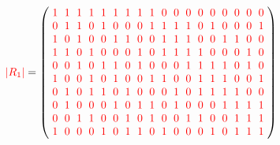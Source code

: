 \documentclass{beamer}
\newcommand{\RR}[1]{\textcolor{red}{#1}}
\newcommand{\abs}[1]{|#1|}
\begin{document}
\begin{frame}

  \[
    \RR{\abs{R_1}} = 
    \left(
      \arraycolsep=3.0pt\def\arraystretch{1.0}
      \begin{array}{cccccccccccccccccc}
        \RR{1}&\RR{1}&\RR{1}&\RR{1}&\RR{1}&\RR{1}&\RR{1}&\RR{1}&\RR{1}&\RR{0}&\RR{0}&\RR{0}&\RR{0}&\RR{0}&\RR{0}&\RR{0}&\RR{0}&\RR{0}\\
        \RR{0}&\RR{1}&\RR{1}&\RR{0}&\RR{1}&\RR{0}&\RR{0}&\RR{0}&\RR{1}&\RR{1}&\RR{1}&\RR{1}&\RR{0}&\RR{1}&\RR{0}&\RR{0}&\RR{0}&\RR{1}\\
        \RR{1}&\RR{0}&\RR{1}&\RR{0}&\RR{0}&\RR{1}&\RR{1}&\RR{0}&\RR{0}&\RR{1}&\RR{1}&\RR{1}&\RR{0}&\RR{0}&\RR{1}&\RR{1}&\RR{0}&\RR{0}\\
        \RR{1}&\RR{1}&\RR{0}&\RR{1}&\RR{0}&\RR{0}&\RR{0}&\RR{1}&\RR{0}&\RR{1}&\RR{1}&\RR{1}&\RR{1}&\RR{0}&\RR{0}&\RR{0}&\RR{1}&\RR{0}\\
        \RR{0}&\RR{0}&\RR{1}&\RR{0}&\RR{1}&\RR{1}&\RR{0}&\RR{1}&\RR{0}&\RR{0}&\RR{0}&\RR{1}&\RR{1}&\RR{1}&\RR{1}&\RR{0}&\RR{1}&\RR{0}\\
        \RR{1}&\RR{0}&\RR{0}&\RR{1}&\RR{0}&\RR{1}&\RR{0}&\RR{0}&\RR{1}&\RR{1}&\RR{0}&\RR{0}&\RR{1}&\RR{1}&\RR{1}&\RR{0}&\RR{0}&\RR{1}\\
        \RR{0}&\RR{1}&\RR{0}&\RR{1}&\RR{1}&\RR{0}&\RR{1}&\RR{0}&\RR{0}&\RR{0}&\RR{1}&\RR{0}&\RR{1}&\RR{1}&\RR{1}&\RR{1}&\RR{0}&\RR{0}\\
        \RR{0}&\RR{1}&\RR{0}&\RR{0}&\RR{0}&\RR{1}&\RR{0}&\RR{1}&\RR{1}&\RR{0}&\RR{1}&\RR{0}&\RR{0}&\RR{0}&\RR{1}&\RR{1}&\RR{1}&\RR{1}\\
        \RR{0}&\RR{0}&\RR{1}&\RR{1}&\RR{0}&\RR{0}&\RR{1}&\RR{0}&\RR{1}&\RR{0}&\RR{0}&\RR{1}&\RR{1}&\RR{0}&\RR{0}&\RR{1}&\RR{1}&\RR{1}\\
        \RR{1}&\RR{0}&\RR{0}&\RR{0}&\RR{1}&\RR{0}&\RR{1}&\RR{1}&\RR{0}&\RR{1}&\RR{0}&\RR{0}&\RR{0}&\RR{1}&\RR{0}&\RR{1}&\RR{1}&\RR{1}\\
      \end{array}
    \right)
  \]
  
\end{frame}
\end{document}
